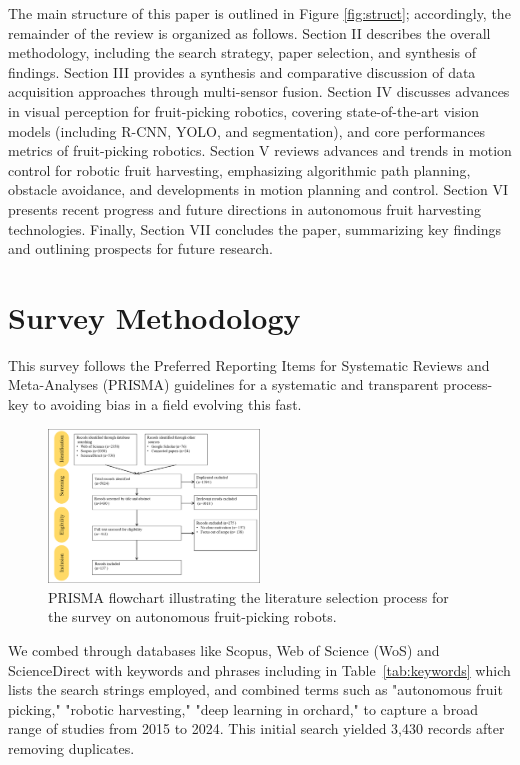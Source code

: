 \documentclass[a4paper,fleqn]{cas-dc}
\begin{document}
The main structure of this paper is outlined in Figure \ref{fig:struct}; accordingly, the remainder of the review is organized as follows. Section II describes the overall methodology, including the search strategy, paper selection, and synthesis of findings. Section III provides a synthesis and comparative discussion of data acquisition approaches through multi-sensor fusion.
Section IV discusses advances in visual perception for fruit-picking robotics, covering state-of-the-art vision models (including R-CNN, YOLO, and segmentation), and core performances metrics of fruit-picking robotics. Section V reviews advances and trends in motion control for robotic fruit harvesting, emphasizing algorithmic path planning, obstacle avoidance, and developments in motion planning and control. Section VI presents recent progress and future directions in autonomous fruit harvesting technologies. Finally, Section VII concludes the paper, summarizing key findings and outlining prospects for future research.

\section{Survey Methodology}
This survey follows the Preferred Reporting Items for Systematic Reviews and Meta-Analyses (PRISMA) guidelines \cite{page2021prisma} for a systematic and transparent process-key to avoiding bias in a field evolving this fast. 

\begin{figure}[h!]
    \centering
    \includegraphics[width=0.5\textwidth]{fig_prisma1.png}
    \caption{ PRISMA flowchart illustrating the literature selection process for the survey on autonomous fruit-picking robots. 
    }
    \label{fig:prisma1}
\end{figure}

We combed through databases like Scopus, Web of Science (WoS) and ScienceDirect with keywords and phrases including in Table~\ref{tab:keywords} which lists the search strings employed, and combined terms such as "autonomous fruit picking," "robotic harvesting," "deep learning in orchard," to capture a broad range of studies from 2015 to 2024. This initial search yielded 3,430 records after removing duplicates.
\end{document}
